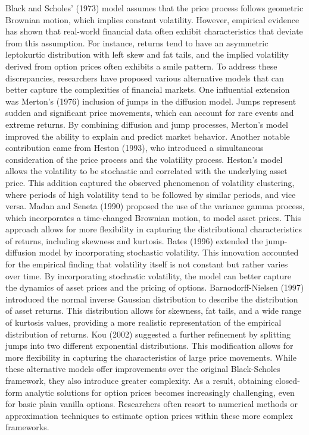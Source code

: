  Black and Scholes' (1973) model assumes that the price process follows geometric Brownian motion, which implies constant volatility. However, empirical evidence has shown that real-world financial data often exhibit characteristics that deviate from this assumption. For instance, returns tend to have an asymmetric leptokurtic distribution with left skew and fat tails, and the implied volatility derived from option prices often exhibits a smile pattern. To address these discrepancies, researchers have proposed various alternative models that can better capture the complexities of financial markets. One influential extension was Merton's (1976) inclusion of jumps in the diffusion model. Jumps represent sudden and significant price movements, which can account for rare events and extreme returns. By combining diffusion and jump processes, Merton's model improved the ability to explain and predict market behavior. Another notable contribution came from Heston (1993), who introduced a simultaneous consideration of the price process and the volatility process. Heston's model allows the volatility to be stochastic and correlated with the underlying asset price. This addition captured the observed phenomenon of volatility clustering, where periods of high volatility tend to be followed by similar periods, and vice versa. Madan and Seneta (1990) proposed the use of the variance gamma process, which incorporates a time-changed Brownian motion, to model asset prices. This approach allows for more flexibility in capturing the distributional characteristics of returns, including skewness and kurtosis. Bates (1996) extended the jump-diffusion model by incorporating stochastic volatility. This innovation accounted for the empirical finding that volatility itself is not constant but rather varies over time. By incorporating stochastic volatility, the model can better capture the dynamics of asset prices and the pricing of options. Barnodorff-Nielsen (1997) introduced the normal inverse Gaussian distribution to describe the distribution of asset returns. This distribution allows for skewness, fat tails, and a wide range of kurtosis values, providing a more realistic representation of the empirical distribution of returns. Kou (2002) suggested a further refinement by splitting jumps into two different exponential distributions. This modification allows for more flexibility in capturing the characteristics of large price movements. While these alternative models offer improvements over the original Black-Scholes framework, they also introduce greater complexity. As a result, obtaining closed-form analytic solutions for option prices becomes increasingly challenging, even for basic plain vanilla options. Researchers often resort to numerical methods or approximation techniques to estimate option prices within these more complex frameworks. \\

